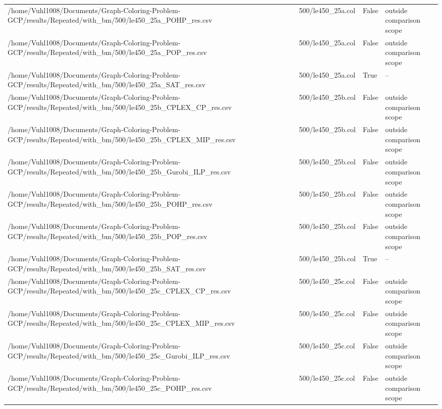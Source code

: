 \begin{table}[htbp]
\begin{tabular}{llll}
/home/Vuhl1008/Documents/Graph-Coloring-Problem-GCP/results/Repeated/with\_bm/500/le450\_25a\_POHP\_res.csv & 500/le450\_25a.col & False & outside comparison scope \\
/home/Vuhl1008/Documents/Graph-Coloring-Problem-GCP/results/Repeated/with\_bm/500/le450\_25a\_POP\_res.csv & 500/le450\_25a.col & False & outside comparison scope \\
/home/Vuhl1008/Documents/Graph-Coloring-Problem-GCP/results/Repeated/with\_bm/500/le450\_25a\_SAT\_res.csv & 500/le450\_25a.col & True & -- \\
/home/Vuhl1008/Documents/Graph-Coloring-Problem-GCP/results/Repeated/with\_bm/500/le450\_25b\_CPLEX\_CP\_res.csv & 500/le450\_25b.col & False & outside comparison scope \\
/home/Vuhl1008/Documents/Graph-Coloring-Problem-GCP/results/Repeated/with\_bm/500/le450\_25b\_CPLEX\_MIP\_res.csv & 500/le450\_25b.col & False & outside comparison scope \\
/home/Vuhl1008/Documents/Graph-Coloring-Problem-GCP/results/Repeated/with\_bm/500/le450\_25b\_Gurobi\_ILP\_res.csv & 500/le450\_25b.col & False & outside comparison scope \\
/home/Vuhl1008/Documents/Graph-Coloring-Problem-GCP/results/Repeated/with\_bm/500/le450\_25b\_POHP\_res.csv & 500/le450\_25b.col & False & outside comparison scope \\
/home/Vuhl1008/Documents/Graph-Coloring-Problem-GCP/results/Repeated/with\_bm/500/le450\_25b\_POP\_res.csv & 500/le450\_25b.col & False & outside comparison scope \\
/home/Vuhl1008/Documents/Graph-Coloring-Problem-GCP/results/Repeated/with\_bm/500/le450\_25b\_SAT\_res.csv & 500/le450\_25b.col & True & -- \\
/home/Vuhl1008/Documents/Graph-Coloring-Problem-GCP/results/Repeated/with\_bm/500/le450\_25c\_CPLEX\_CP\_res.csv & 500/le450\_25c.col & False & outside comparison scope \\
/home/Vuhl1008/Documents/Graph-Coloring-Problem-GCP/results/Repeated/with\_bm/500/le450\_25c\_CPLEX\_MIP\_res.csv & 500/le450\_25c.col & False & outside comparison scope \\
/home/Vuhl1008/Documents/Graph-Coloring-Problem-GCP/results/Repeated/with\_bm/500/le450\_25c\_Gurobi\_ILP\_res.csv & 500/le450\_25c.col & False & outside comparison scope \\
/home/Vuhl1008/Documents/Graph-Coloring-Problem-GCP/results/Repeated/with\_bm/500/le450\_25c\_POHP\_res.csv & 500/le450\_25c.col & False & outside comparison scope \\

\end{tabular}
\end{table}
